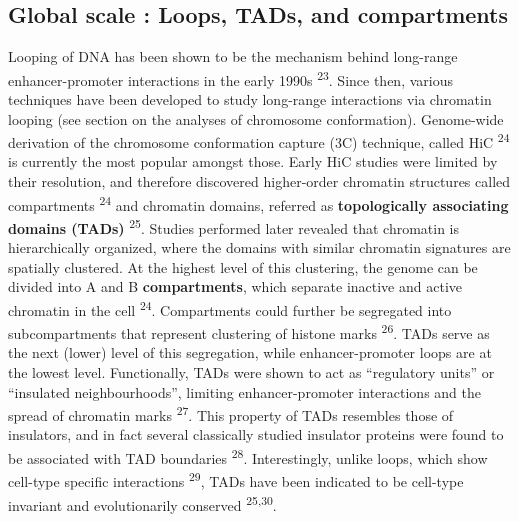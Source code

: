 \documentclass[11pt,twoside]{MPIthesis}
\theoremstyle{definition}
\theoremstyle{definition}
\theoremstyle{definition}
\theoremstyle{remark}
\begin{document}
\subsection{Global scale : Loops, TADs, and
compartments}\label{global-scale-loops-tads-and-compartments}

Looping of DNA has been shown to be the mechanism behind long-range
enhancer-promoter interactions in the early 1990s \textsuperscript{23}.
Since then, various techniques have been developed to study long-range
interactions via chromatin looping (see section on the analyses of
chromosome conformation). Genome-wide derivation of the chromosome
conformation capture (3C) technique, called HiC \textsuperscript{24} is
currently the most popular amongst those. Early HiC studies were limited
by their resolution, and therefore discovered higher-order chromatin
structures called compartments \textsuperscript{24} and chromatin
domains, referred as \textbf{topologically associating domains (TADs)}
\textsuperscript{25}. Studies performed later revealed that chromatin is
hierarchically organized, where the domains with similar chromatin
signatures are spatially clustered. At the highest level of this
clustering, the genome can be divided into A and B
\textbf{compartments}, which separate inactive and active chromatin in
the cell \textsuperscript{24}. Compartments could further be segregated
into subcompartments that represent clustering of histone marks
\textsuperscript{26}. TADs serve as the next (lower) level of this
segregation, while enhancer-promoter loops are at the lowest level.
Functionally, TADs were shown to act as ``regulatory units'' or
``insulated neighbourhoods'', limiting enhancer-promoter interactions
and the spread of chromatin marks \textsuperscript{27}. This property of
TADs resembles those of insulators, and in fact several classically
studied insulator proteins were found to be associated with TAD
boundaries \textsuperscript{28}. Interestingly, unlike loops, which show
cell-type specific interactions \textsuperscript{29}, TADs have been
indicated to be cell-type invariant and evolutionarily conserved
\textsuperscript{25,30}.
\end{document}
